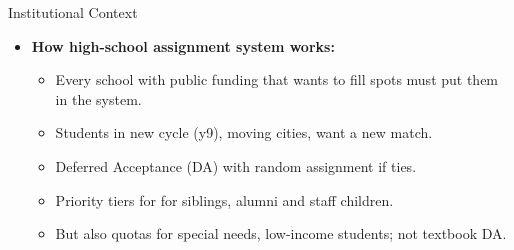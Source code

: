 \documentclass[notes,11pt, aspectratio=169]{beamer}
\newenvironment{wideitemize}{%
  \begin{minipage}{0.90\textwidth}
  \begin{itemize}
  \addtolength{\itemsep}{1em}
}{%
  \end{itemize}
  \end{minipage}
}
\begin{document}
\begin{frame}{Institutional Context}
\begin{wideitemize}


\item \textbf{How high-school assignment system works:}
    \begin{itemize}
        \item Every school with public funding that wants to fill spots must put them in the system. 
        \item Students in new cycle (y9), moving cities, want a new match.
        \item Deferred Acceptance (DA) with random assignment if ties. 
        \item Priority tiers for for siblings, alumni and staff children.
        \item But also quotas for special needs, low-income students; not textbook DA.
    \end{itemize}



            




\end{wideitemize}
\end{frame}
\end{document}
